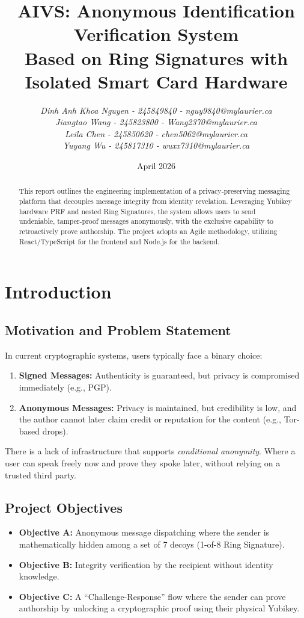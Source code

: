 \documentclass[letterpaper,11pt]{article}
\title{\textbf{AIVS: Anonymous Identification Verification System}\\Based on Ring Signatures with Isolated Smart Card Hardware}
\author{
\textit{Dinh Anh Khoa Nguyen - 245849840 - nguy9840@mylaurier.ca}\\
\textit{Jiangtao Wang - 245823800 - Wang2370@mylaurier.ca}\\
\textit{Leila Chen - 245850620 - chen5062@mylaurier.ca}\\
\textit{Yuyang Wu - 245817310 - wuxx7310@mylaurier.ca}\\
}
\date{April 2026}
\begin{document}
\maketitle
\thispagestyle{empty}

\begin{abstract}
    This report outlines the engineering implementation of a privacy-preserving messaging platform that decouples message integrity from identity revelation. Leveraging Yubikey hardware PRF and nested Ring Signatures, the system allows users to send undeniable, tamper-proof messages anonymously, with the exclusive capability to retroactively prove authorship. The project adopts an Agile methodology, utilizing React/TypeScript for the frontend and Node.js for the backend.
\end{abstract}
\newpage

\tableofcontents
\newpage

\section{Introduction}

\subsection{Motivation and Problem Statement}
In current cryptographic systems, users typically face a binary choice:
\begin{enumerate}
    \item \textbf{Signed Messages:} Authenticity is guaranteed, but privacy is compromised immediately (e.g., PGP).
    \item \textbf{Anonymous Messages:} Privacy is maintained, but credibility is low, and the author cannot later claim credit or reputation for the content (e.g., Tor-based drops).
\end{enumerate}
There is a lack of infrastructure that supports \textit{conditional anonymity}. Where a user can speak freely now and prove they spoke later, without relying on a trusted third party.

\subsection{Project Objectives}
\begin{itemize}
    \item \textbf{Objective A:} Anonymous message dispatching where the sender is mathematically hidden among a set of 7 decoys (1-of-8 Ring Signature).
    \item \textbf{Objective B:} Integrity verification by the recipient without identity knowledge.
    \item \textbf{Objective C:} A ``Challenge-Response'' flow where the sender can prove authorship by unlocking a cryptographic proof using their physical Yubikey.
\end{itemize}
\end{document}
